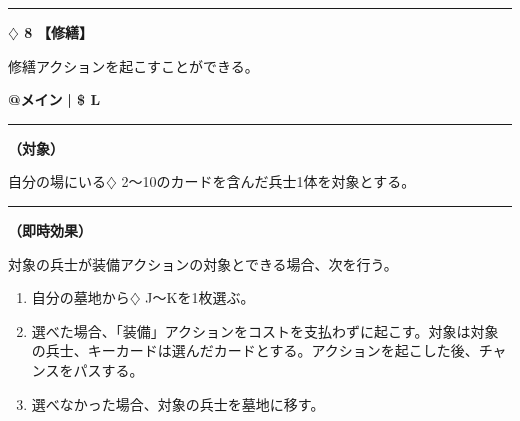 \documentclass[twocolumn,a5paper,papersize,10pt]{jarticle}
\begin{document}
\vspace{-1zh}
  
 

\vspace{3mm} %
\hrule height 0.5mm depth 0mm width 66.5mm %
\vspace{1mm} %
{\Large\bf $\diamondsuit$ 8} {\normalsize\bf【修繕】} %
\vspace{1mm} %

修繕アクションを起こすことができる。

\begin{tcolorbox}[title={\small\bf【Action】修繕}{\scriptsize （通常魔法）}]

{\scriptsize\bf @メイン }
  {\scriptsize\bf | \$ L }

\vspace{1mm} %
\hrule height 0.1mm depth 0mm width 62mm %
\vspace{1mm} %

{\bf（対象）}

自分の場にいる{\normalsize $\diamondsuit$} 2〜10のカードを含んだ兵士1体を対象とする。

\vspace{1mm} %
\hrule height 0.1mm depth 0mm width 62mm %
\vspace{1mm} %

{\bf（即時効果）}

対象の兵士が装備アクションの対象とできる場合、次を行う。


\vspace{-1zh}%
\begin{enumerate}
\setlength{\leftskip}{-0.3cm}
\setlength{\parskip}{0pt} %

\item 自分の墓地から{\normalsize $\diamondsuit$} J〜Kを1枚選ぶ。

\item 選べた場合、「装備」アクションをコストを支払わずに起こす。対象は対象の兵士、キーカードは選んだカードとする。アクションを起こした後、チャンスをパスする。

\item 選べなかった場合、対象の兵士を墓地に移す。
\vspace{-1zh}%
\end{enumerate}

\vspace{1mm} %
\end{tcolorbox}
\end{document}
